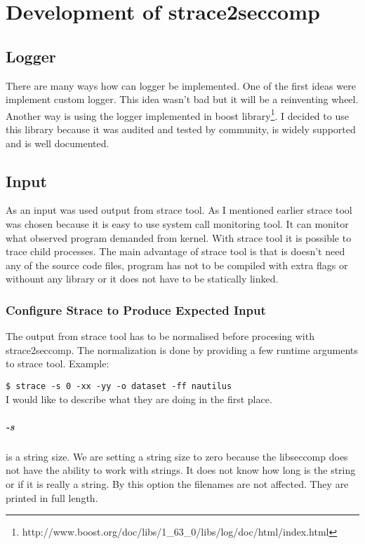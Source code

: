 \chapter{Development of strace2seccomp}
\section{Logger}
There are many ways how can logger be implemented.
One of the first ideas were implement custom logger.
This idea wasn't bad but it will be a reinventing wheel.
Another way is using the logger implemented in boost library\footnote{http://www.boost.org/doc/libs/1\_63\_0/libs/log/doc/html/index.html}.
I decided to use this library because it was audited and tested by community, is widely supported and is well documented.

\section{Input}
As an input was used output from strace tool. As I mentioned earlier strace tool was
chosen because it is easy to use system call monitoring tool. It can monitor what observed
program demanded from kernel. With strace tool it is possible to trace child processes.
The main advantage of strace tool is that is doesn't need any of the source code files,
program has not to be compiled with extra flags or withount any library or
it does not have to be statically linked.

\subsection{Configure Strace to Produce Expected Input}
\label{sec:strace_config}

The output from strace tool has to be normalised before procesing with strace2seccomp.
The normalization is done by providing a few runtime arguments to strace tool.
Example:

\texttt{\$ strace -s 0 -xx -yy -o dataset -ff nautilus }
\\
I would like to describe what they are doing in the first place.\cite{strace_man}

\paragraph{-s} is a string size. We are setting a string size to zero because the
libseccomp does not have the ability to work with strings. It does not know how long is
the string or if it is really a string. By this option the filenames are not affected.
They are printed in full length.

